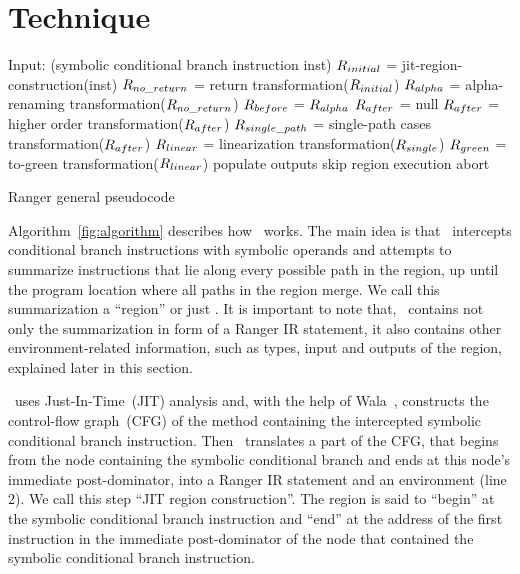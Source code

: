 \section{Technique}
\label{sec:technique}
%
\begin{algorithm}[]
\SetAlgoLined
Input: (symbolic conditional branch instruction inst)\;
$R_{initial}$ = jit-region-construction(inst)\;
$R_{no\_return}$ =  return transformation($R_{initial}$)\;
$R_{alpha}$ =  alpha-renaming transformation($R_{no\_return}$)\;
$R_{before}$ = $R_{alpha}$\;
$R_{after}$ = null\;
{
		$R_{after}$ =  higher order transformation($R_{after}$)\;
	}
$R_{single\_path}$ = single-path cases transformation($R_{after}$)\;
$R_{linear}$ = linearization transformation($R_{single}$)\;
	{$R_{green}$ = to-green transformation($R_{linear}$)\;   
	populate outputs  
	skip region execution\;}
   {abort }
\caption{Ranger general pseudocode}
\label{fig:algorithm}
\end{algorithm}

Algorithm~\ref{fig:algorithm} describes how \tool\ works.
%
The main idea is that \toolshort\ intercepts
conditional branch instructions with symbolic operands and attempts to summarize instructions that lie along
every possible path in the region, up until the program location where all paths in the region merge.
%
We call this summarization a ``region'' or just \region.
%
It is important to note that, \region\ contains not only the summarization in form of a Ranger IR
statement, it also contains other environment-related information, such as types, input and outputs of the region,
explained later in this section.

\tool\ uses Just-In-Time~(JIT) analysis and, with the help of Wala~\cite{Wala},
constructs the control-flow graph~(CFG) of the method containing the intercepted symbolic conditional branch instruction.
%
Then \toolshort\ translates a part of the CFG, that begins from the node containing the symbolic conditional branch
and ends at this node\rq s immediate post-dominator,
into a Ranger IR statement and an environment (line 2). We call this step ``JIT region construction''.
%
The region is said to ``begin'' at the symbolic conditional branch instruction and ``end'' at the address of the first
instruction in the immediate post-dominator of the node that contained the symbolic conditional branch instruction.

